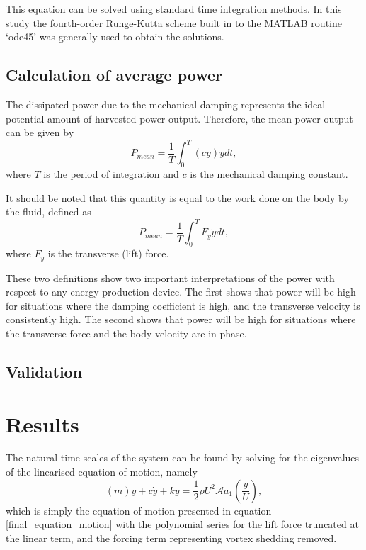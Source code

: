 This equation can be solved using standard time integration methods. In this study the fourth-order Runge-Kutta scheme built in to the MATLAB routine `ode45' was generally used to obtain the solutions. 

\subsection{Calculation of average power}

 The dissipated power due to the mechanical damping represents the ideal potential amount of harvested power output. Therefore, the mean power output can be given by
\begin{equation}
\label{power}
P_{mean}=\frac{1}{T}\int_{0}^{T}(c\dot{y})\dot{y} dt,
\end{equation}
where $T$ is the period of integration and $c$ is the mechanical damping constant. 

It should be noted that this quantity is equal to the work done on the body by the fluid, defined as
\begin{equation}
\label{power_alt}
P_{mean}=\frac{1}{T}\int_{0}^{T}F_y\dot{y} dt,
\end{equation}
where $F_y$ is the transverse (lift) force.

  These two definitions show two important interpretations of the power with respect to any energy production device. The first shows that power will be high for situations where the damping coefficient is high, and the transverse velocity is consistently high. The second shows that power will be high for situations where the transverse force and the body velocity are in phase.
 
 

 
 
 \subsection{Validation}
 \label{ubsec:validation}
 
 
 
 \section{Results}
  \label{sec:results}
 
  The natural time scales of the system can be found by solving for the eigenvalues of the linearised equation of motion, namely
 \begin{equation}
 \label{eqn:eom_linear}
 (m)\ddot{y}{+}c\dot{y}{+}ky{=}\frac{1}{2}\rho U^2 \mathcal{A} a_1\left(\frac{\dot{y}}{U}\right),
 \end{equation}
 which is simply the equation of motion presented in equation \ref{final_equation_motion} with the polynomial series for the lift force truncated at the linear term, and the forcing term representing vortex shedding removed.
 
